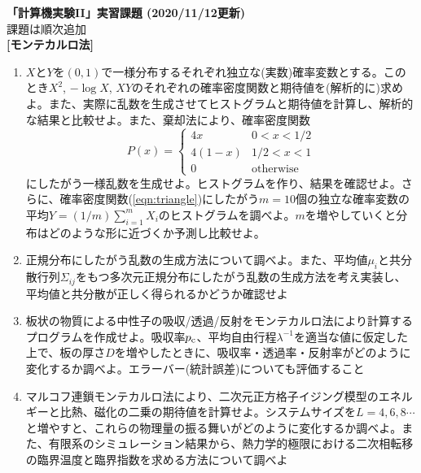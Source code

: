 \documentclass[11pt]{jarticle}
\begin{document}
\noindent
{\bf\large 「計算機実験II」実習課題 (2020/11/12更新)}
\\[-0.5em]

\noindent
課題は順次追加\\[-0.5em]


{\bf [モンテカルロ法]}
\begin{enumerate}

\item $X$と$Y$を$(0,1)$で一様分布するそれぞれ独立な(実数)確率変数とする。このとき$X^2$, $-\log X$, $XY$のそれぞれの確率密度関数と期待値を(解析的に)求めよ。また、実際に乱数を生成させてヒストグラムと期待値を計算し、解析的な結果と比較せよ。また、棄却法により、確率密度関数
  \begin{equation}
    P(x) = \begin{cases} 4x & 0 < x < 1/2 \\
      4(1-x) & 1/2 < x < 1 \\
      0 & \text{otherwise}
    \end{cases}
    \label{eqn:triangle}
  \end{equation}
  にしたがう一様乱数を生成せよ。ヒストグラムを作り、結果を確認せよ。さらに、確率密度関数(\ref{eqn:triangle})にしたがう$m=10$個の独立な確率変数の平均$Y=(1/m) \sum_{i=1}^m X_i$のヒストグラムを調べよ。$m$を増やしていくと分布はどのような形に近づくか予測し比較せよ。
  
\item 正規分布にしたがう乱数の生成方法について調べよ。また、平均値$\mu_i$と共分散行列$\Sigma_{ij}$をもつ多次元正規分布にしたがう乱数の生成方法を考え実装し、平均値と共分散が正しく得られるかどうか確認せよ

\item 板状の物質による中性子の吸収/透過/反射をモンテカルロ法により計算するプログラムを作成せよ。吸収率$p_{\rm c}$、平均自由行程$\lambda^{-1}$を適当な値に仮定した上で、板の厚さ$D$を増やしたときに、吸収率・透過率・反射率がどのように変化するか調べよ。エラーバー(統計誤差)についても評価すること

\item マルコフ連鎖モンテカルロ法により、二次元正方格子イジング模型のエネルギーと比熱、磁化の二乗の期待値を計算せよ。システムサイズを$L=4, 6,8\cdots$と増やすと、これらの物理量の振る舞いがどのように変化するか調べよ。また、有限系のシミュレーション結果から、熱力学的極限における二次相転移の臨界温度と臨界指数を求める方法について調べよ


\end{enumerate}
\end{document}
